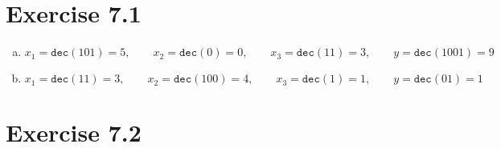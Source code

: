 \documentclass{article} %
\newcommand{\homeworkNumber}{7}
\begin{document}
\section*{Exercise \homeworkNumber.1}
\begin{enumerate}[(a)]
\item
$$
x_1 = \texttt{dec}(101) = 5,\qquad x_2 = \texttt{dec}(0) = 0,\qquad x_3 = \texttt{dec}(11) = 3,\qquad y = \texttt{dec}(1001) = 9
$$
\item
$$
x_1 = \texttt{dec}(11) = 3,\qquad x_2 = \texttt{dec}(100) = 4,\qquad x_3 = \texttt{dec}(1) = 1,\qquad y = \texttt{dec}(01) = 1
$$
\end{enumerate}

\section*{Exercise \homeworkNumber.2}
\end{document}
